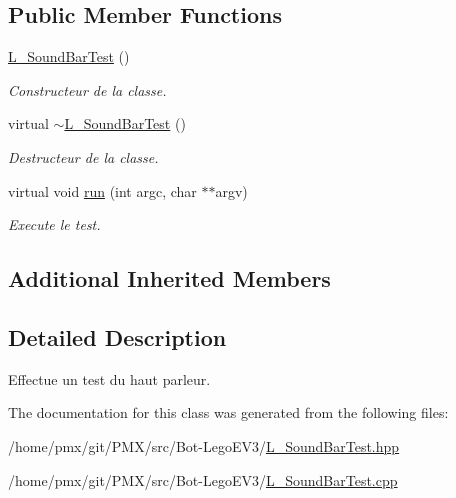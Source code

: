 \subsection*{Public Member Functions}
\begin{DoxyCompactItemize}
\item 
\mbox{\label{classL__SoundBarTest_a9883412997e8cfc2c481131b7c708733}} 
\hyperlink{classL__SoundBarTest_a9883412997e8cfc2c481131b7c708733}{L\+\_\+\+Sound\+Bar\+Test} ()
\begin{DoxyCompactList}\small\item\em Constructeur de la classe. \end{DoxyCompactList}\item 
\mbox{\label{classL__SoundBarTest_a4de7f639d878256fcbf48997337ff3fd}} 
virtual \hyperlink{classL__SoundBarTest_a4de7f639d878256fcbf48997337ff3fd}{$\sim$\+L\+\_\+\+Sound\+Bar\+Test} ()
\begin{DoxyCompactList}\small\item\em Destructeur de la classe. \end{DoxyCompactList}\item 
\mbox{\label{classL__SoundBarTest_ad518b52a13cf17ad327f7b96e3d3e44b}} 
virtual void \hyperlink{classL__SoundBarTest_ad518b52a13cf17ad327f7b96e3d3e44b}{run} (int argc, char $\ast$$\ast$argv)
\begin{DoxyCompactList}\small\item\em Execute le test. \end{DoxyCompactList}\end{DoxyCompactItemize}
\subsection*{Additional Inherited Members}


\subsection{Detailed Description}
Effectue un test du haut parleur. 

The documentation for this class was generated from the following files\+:\begin{DoxyCompactItemize}
\item 
/home/pmx/git/\+P\+M\+X/src/\+Bot-\/\+Lego\+E\+V3/\hyperlink{L__SoundBarTest_8hpp}{L\+\_\+\+Sound\+Bar\+Test.\+hpp}\item 
/home/pmx/git/\+P\+M\+X/src/\+Bot-\/\+Lego\+E\+V3/\hyperlink{L__SoundBarTest_8cpp}{L\+\_\+\+Sound\+Bar\+Test.\+cpp}\end{DoxyCompactItemize}
